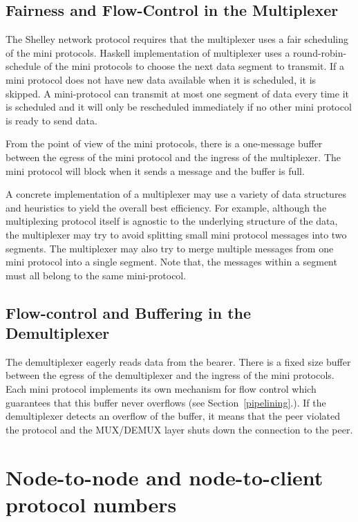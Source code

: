 \subsection{Fairness and Flow-Control in the Multiplexer}
The Shelley network protocol requires that the multiplexer uses a fair
scheduling of the mini protocols.  Haskell implementation of
multiplexer uses a round-robin-schedule of the mini protocols to choose the
next data segment to transmit.  If a mini protocol does not have new data
available when it is scheduled, it is skipped.  A mini-protocol can transmit at
most one segment of data every time it is scheduled and it will only be
rescheduled immediately if no other mini protocol is ready to send data.

From the point of view of the mini protocols, there is a one-message buffer between the egress of
the mini protocol and the ingress of the multiplexer.
The mini protocol will block when it sends a message and the buffer is full.

A concrete implementation of a multiplexer may use a variety of data structures and heuristics to
yield the overall best efficiency.
For example, although the multiplexing protocol itself is agnostic to the underlying structure of
the data, the multiplexer may try to avoid splitting small mini protocol messages into two segments.
The multiplexer may also try to merge multiple messages from one mini protocol into a
single segment.
Note that, the messages within a segment must all belong to the same mini-protocol.

\subsection{Flow-control and Buffering in the Demultiplexer}
\label{mux-flow-control}
The demultiplexer eagerly reads data from the bearer.
There is a fixed size buffer between the egress of the demultiplexer and the ingress of
the mini protocols.
Each mini protocol implements its own mechanism for flow control which guarantees that this buffer
never overflows (see Section~\ref{pipelining}.).
If the demultiplexer detects an overflow of the buffer, it means that the peer violated the
protocol and the MUX/DEMUX layer shuts down the connection to the peer.


\section{Node-to-node and node-to-client protocol numbers}
\noindent{}
\newline{}
\newline{}

